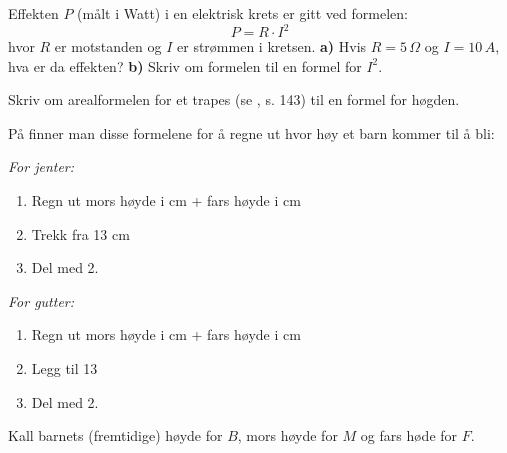 \begin{comment}
\op{frm4}
Formelen for BMI (Body Mass Index) ser slik ut:
\[ \text{BMI}=\frac{m}{h^2} \]
hvor $ m $ betyr en persons vekt (i kg) og $ h $ er personens høyde (i meter).\os

\textbf{a)} Hvis en person har $ {\text{BMI}=29} $ og er 2\,m høy, hvor mye veier da personen?\os
\textbf{b)} Hvis en person har $ {\text{BMI}=23} $ og veier 75\,kg, hvor høy er personen?\os
{\small 
\obs BMI er et mål som er lagd for å studere relasjonen mellom vekt og høyde \textsl{for store folkegrupper}. Det kan være interessant å vite hva BMI-en til 1000 mennesker er, men BMI-en til enkeltmennesker sier svært lite om personen. For eksempel blir både Aksel Lund Svindal og Ragnhild Mowinckel, to av Norges best trente atleter, definert som overvektige på BMI-skalaen.
\begin{center}
\texttt{[image: aksel]}
\texttt{[image: rag]}
\end{center}
Vi har brukt BMI-en til enkeltpersoner i oppgaven fordi det gir oss øving i formelregning.}
\end{comment}
Effekten $ P $ (målt i Watt) i en elektrisk krets er gitt ved formelen:
\[ P=R\cdot I^2 \]
hvor $ R $ er motstanden og $ I $ er strømmen i kretsen.\os
\textbf{a)} Hvis $ {R=5\,\Omega} $ og $ {I=10\,A} $, hva er da effekten?\os
\textbf{b)} Skriv om formelen til en formel for $ I^2 $.

Skriv om arealformelen for et trapes (se \mb, s. 143) til en formel for høgden.

På
 finner man disse formelene for å regne ut hvor høy et barn kommer til å bli:\os

\textit{For jenter:}
\begin{enumerate}
	\item Regn ut mors høyde i cm + fars høyde i cm
	\item Trekk fra 13 cm
	\item Del med 2.
\end{enumerate}

\textit{For gutter:}
\begin{enumerate}
	\item Regn ut mors høyde i cm + fars høyde i cm
	\item Legg til 13 
	\item Del med 2.
\end{enumerate}
Kall barnets (fremtidige) høyde for $ B $, mors høyde for $ M $ og fars høde for $ F $.

